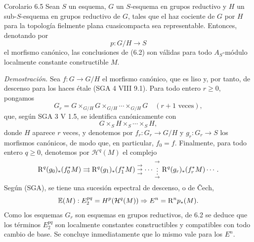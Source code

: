 \begin{statement}{Corolario 6.5}
Sean $S$ un esquema, $G$ un $S$-esquema en grupos reductivo y $H$ un sub-$S$-esquema en grupos reductivo de $G$, tales que el haz cociente de $G$ por $H$ para la topología fielmente plana cuasicompacta sea representable. Entonces, denotando por
\[
p:G/H\to S
\]
el morfismo canónico, las conclusiones de (6.2) son válidas para todo $A_S$-módulo localmente constante constructible $M$.
\end{statement}

\emph{Demostración.} Sea $f:G\to G/H$ el morfismo canónico, que es liso y, por tanto, de descenso para los haces étale (SGA 4 VIII 9.1). Para todo entero $r\ge0$, pongamos
\[
G_r=G\times_{G/H}G\times_{G/H}\cdots\times_{G/H}G
\quad(r+1\text{ veces}),
\]
que, según SGA 3 V 1.5, se identifica canónicamente con
\[
G\times_S H\times_S\cdots\times_S H,
\]
donde $H$ aparece $r$ veces, y denotemos por $f_r:G_r\to G/H$ y $g_r:G_r\to S$ los morfismos canónicos, de modo que, en particular, $f_0=f$. Finalmente, para todo entero $q\ge0$, denotemos por $\mathcal H^q(M)$ el complejo
\[
\mathrm{R}^q(g_0)_*(f_0^*M)\rightrightarrows \mathrm{R}^q(g_1)_*(f_1^*M)\mathrel{\substack{\to\\\to\\\to}}\cdots\mathrel{\substack{\to\\\vdots\\\to}} \mathrm{R}^q(g_r)_*(f_r^*M)\cdots .
\]
Según (SGA), se tiene una sucesión espectral de descenso, o de Čech,
\[
\mathbb E(M):E_2^{pq}=H^p(\mathcal H^q(M))\Rightarrow E^n=\mathrm{R}^np_*(M).
\]
Como los esquemas $G_r$ son esquemas en grupos reductivos, de 6.2 se deduce que los términos $E_2^{pq}$ son localmente constantes constructibles y compatibles con todo cambio de base. Se concluye inmediatamente que lo mismo vale para los $E^n$.
